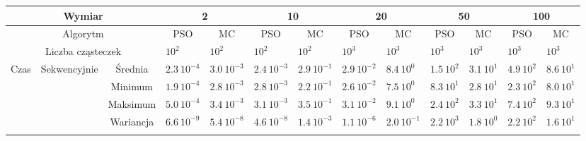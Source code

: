 \documentclass[11pt, a4paper, oneside]{article}
\begin{document}
\renewcommand{\arraystretch}{2}
\begin{table}[h]
\scriptsize
\begin{adjustwidth}{-1.76cm}{}
\centering
\begin{tabular}{|c|c|c|l|l|l|l|l|l|l|l|l|l|}
\hline
\multicolumn{3}{|c|}{Wymiar}                                      & \multicolumn{2}{c|}{2}                             & \multicolumn{2}{c|}{10}                            & \multicolumn{2}{c|}{20}                            & \multicolumn{2}{c|}{50}                            & \multicolumn{2}{c|}{100}                           \\ \hline
\multicolumn{3}{|c|}{Algorytm}                                    & \multicolumn{1}{c|}{PSO} & \multicolumn{1}{c|}{MC} & \multicolumn{1}{c|}{PSO} & \multicolumn{1}{c|}{MC} & \multicolumn{1}{c|}{PSO} & \multicolumn{1}{c|}{MC} & \multicolumn{1}{c|}{PSO} & \multicolumn{1}{c|}{MC} & \multicolumn{1}{c|}{PSO} & \multicolumn{1}{c|}{MC} \\ \hline
\multicolumn{3}{|c|}{Liczba cząsteczek}                           & $10^{2}$                 & $10^{2}$                & $10^{2}$                 & $10^{2}$                & $10^{3}$                 & $10^{3}$                & $10^{3}$                 & $10^{3}$                & $10^{3}$                 & $10^{3}$                \\ \hline
\multirow{8}{*}{Czas} & \multirow{4}{*}{Sekwencyjnie} & Średnia   & $2.3 \ 10^{-4}$          & $3.0 \ 10^{-3}$         & $2.4 \ 10^{-3}$          & $2.9 \ 10^{-1}$         & $2.9 \ 10^{-2}$          & $8.4 \ 10^{0}$          & $1.5 \ 10^{2}$           & $3.1 \ 10^{1}$          & $4.9 \ 10^{2}$           & $8.6 \ 10^{1}$          \\ \cline{3-13} 
                      &                               & Minimum   & $1.9 \ 10^{-4}$          & $2.8 \ 10^{-3}$         & $2.8 \ 10^{-3}$          & $2.2 \ 10^{-1}$         & $2.6 \ 10^{-2}$          & $7.5 \ 10^{0}$          & $8.3 \ 10^{1}$           & $2.8 \ 10^{1}$          & $2.3 \ 10^{2}$           & $8.0 \ 10^{1}$          \\ \cline{3-13} 
                      &                               & Maksimum  & $5.0 \ 10^{-4}$          & $3.4 \ 10^{-3}$         & $3.1 \ 10^{-3}$          & $3.5 \ 10^{-1}$         & $3.1 \ 10^{-2}$          & $9.1 \ 10^{0}$          & $2.4 \ 10^{2}$           & $3.3 \ 10^{1}$          & $7.4 \ 10^{2}$           & $9.3 \ 10^{1}$          \\ \cline{3-13} 
                      &                               & Wariancja & $6.6 \ 10^{-9}$          & $5.4 \ 10^{-8}$         & $4.6 \ 10^{-8}$          & $1.4 \ 10^{-3}$         & $1.1 \ 10^{-6}$          & $2.0 \ 10^{-1}$         & $2.2 \ 10^{3}$           & $1.8 \ 10^{0}$          & $2.2 \ 10^{2}$           & $1.6 \ 10^{1}$          \\ \cline{2-13} 

\end{tabular}
\end{adjustwidth}
\end{table}
\end{document}

